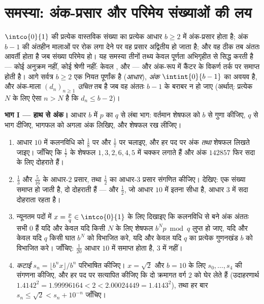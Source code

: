 \section{समस्या: अंक-प्रसार और परिमेय संख्याओं की लय}

\begin{problem}
\label{pb:b1:reals:1}
$\intco{0}{1}$ की प्रत्येक वास्तविक संख्या का प्रत्येक आधार $b \geq 2$ में
अंक-प्रसार होता है; अंक $b - 1$ की अंतहीन मालाओं पर रोक लगा देने पर वह
प्रसार अद्वितीय हो जाता है; और वह ठीक तब अंततः आवर्ती होता है जब संख्या
परिमेय हो। यह समस्या तीनों तथ्य केवल पूर्णता अभिगृहीत से सिद्ध करती है ---
कोई अनुक्रम नहीं, कोई श्रेणी नहीं: केवल ,  और  --- और अंक-रूप में कैंटर के विकर्ण तर्क पर समाप्त होती है। आगे सर्वत्र
$b \geq 2$ एक नियत पूर्णांक है (\emph{आधार}), \emph{अंक} $\intint{0}{b-1}$
का अवयव है, और अंक-माला $(d_n)_{n \geq 1}$ \emph{उचित} तब है जब वह अंततः $b
- 1$ के बराबर न हो जाए (अर्थात्: प्रत्येक $N$ के लिए ऐसा $n > N$ है कि $d_n
\leq b - 2$)।

\medskip \noindent\textbf{भाग I --- हाथ से अंक।} आधार $b$ में $p$ का $q$ से
लंबा भाग: वर्तमान शेषफल को $b$ से गुणा कीजिए, $q$ से भाग दीजिए, भागफल को
अगला अंक लिखिए, और शेषफल रख लीजिए।
\begin{enumerate}
  \item आधार $10$ में कलनविधि को $\frac 18$ पर और $\frac 17$ पर चलाइए, और हर
  पद पर अंक \emph{तथा} शेषफल लिखते जाइए। जाँचिए कि $\frac 17$ के शेषफल $1,
  3, 2, 6, 4, 5$ में चक्कर लगाते हैं और अंक $142857$ फिर सदा के लिए दोहराते
  हैं।
  \item $\frac 13$ और $\frac{5}{16}$ के आधार-$2$ प्रसार, तथा $\frac 12$ का
  आधार-$3$ प्रसार संगणित कीजिए। देखिए: एक संख्या समाप्त हो जाती है, दो
  दोहराती हैं --- और $\frac 12$, जो आधार $10$ में इतना सीधा है, आधार $3$ में
  सदा दोहराता रहता है।
  \item न्यूनतम पदों में $x = \frac pq \in \intco{0}{1}$ के लिए दिखाइए कि
  कलनविधि से बने अंक अंततः सभी $0$ हैं यदि और केवल यदि किसी $N$ के लिए शेषफल
  $b^N p \bmod q$ लुप्त हो जाए, यदि और केवल यदि $q$ किसी घात $b^N$ को
  विभाजित करे, यदि और केवल यदि $q$ का प्रत्येक  गुणनखंड $b$ को विभाजित
  करे। जाँचिए: $\frac{1}{20}$ आधार $10$ में समाप्त होता है, $3$ में नहीं।
  \item \emph{कटाई} $s_n = \lfloor b^n x \rfloor / b^n$ परिभाषित कीजिए। $x =
  \sqrt 2$ और $b = 10$ के लिए $s_0, \dots, s_4$ की संगणना कीजिए, और हर पद पर
  सत्यापित कीजिए कि दो क्रमागत वर्ग $2$ को घेर लेते हैं (उदाहरणार्थ
  $1.4142^2 = 1.99996164 < 2 < 2.00024449 = 1.4143^2$), तथा हर बार $s_n \leq
  \sqrt 2 < s_n + 10^{-n}$ जाँचिए।
\end{enumerate}


\end{problem}
